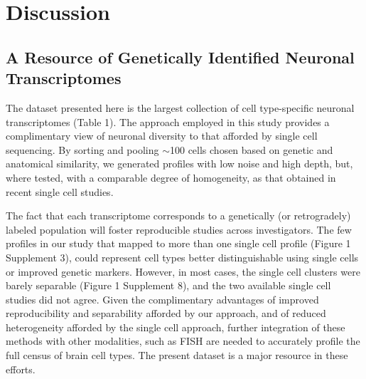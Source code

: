 
\section{Discussion}

\subsection{A Resource of Genetically Identified Neuronal Transcriptomes}

The dataset presented here is the largest collection of cell type-specific neuronal transcriptomes (Table 1). The approach employed in this study provides a complimentary view of neuronal diversity to that afforded by single cell sequencing. By sorting and pooling $\sim$100 cells chosen based on genetic and anatomical similarity, we generated profiles with low noise and high depth, but, where tested, with a comparable degree of homogeneity, as that obtained in recent single cell studies. 

The fact that each transcriptome corresponds to a genetically (or retrogradely) labeled population will foster reproducible studies across investigators. The few profiles in our study that mapped to more than one single cell profile (Figure 1 Supplement 3), could represent cell types better distinguishable using single cells or improved genetic markers. However, in most cases, the single cell clusters were barely separable (Figure 1 Supplement 8), and the two available single cell studies did not agree. Given the complimentary advantages of improved reproducibility and separability afforded by our approach, and of reduced heterogeneity afforded by the single cell approach, further integration of these methods with other modalities, such as FISH \citep{Moffitt_2016} are needed to accurately profile the full census of brain cell types. The present dataset is a major resource in these efforts. 

